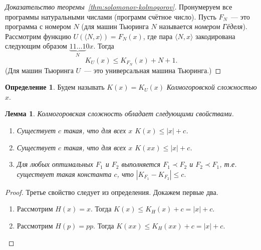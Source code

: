 \documentclass[12pt]{article}
\theoremstyle{definition}
\newtheorem{definition}{Определение}[section]
\theoremstyle{plain}
\newtheorem{lemma}{Лемма}[section]
\theoremstyle{remark}
\begin{document}
\begin{proof}[Доказательство теоремы~\ref{thm:solomonov-kolmogorov}]
    Пронумеруем все программы натуральными числами (программ счётное число). Пусть $F_N$~— 
    это программа с номером $N$ (для машин Тьюринга $N$ называется \emph{номером Гёделя}). 
    Рассмотрим функцию $U(\langle N, x\rangle) = F_N(x)$, где пара $\langle
    N,x\rangle$ закодирована следующим образом $\underbrace{11\dots1}_{N}0x$.
    Тогда 
    \[
        K_U(x)\le K_{F_N}(x) + N + 1.
    \]
    (Для машин Тьюринга $U$~--- это универсальная машина Тьюринга.)
\end{proof}
\begin{definition}
    Будем называть $K(x) = K_U(x)$ \emph{Колмогоровской сложностью $x$}.
\end{definition}

\begin{lemma} Колмогоровская сложность обладает следующими свойствами.
\begin{enumerate}
    \item Существует $c$ такая, что для всех $x$ $K(x)\le |x| + c$. 
    \item Существует $c$ такая, что для всех $x$ $K(xx)\le |x| + c$.
    \item Для любых оптимальных $F_1$ и $F_2$ выполняется $F_1\prec F_2$ и $F_2\prec F_1$,
        т.е. существует такая константа $c$, что 
        \(
            |K_{F_1} - K_{F_2}| \le c.            
        \)
\end{enumerate}
\end{lemma}
\begin{proof} Третье свойство следует из определения. Докажем первые два.
\begin{enumerate}
    \item Рассмотрим $H(x) = x$. Тогда
        \(K(x)\le K_H(x) + c = |x| + c\).
    \item Рассмотрим $H(p) = pp$. Тогда
        \(K(xx)\le K_H(xx) + c = |x| + c\).
\end{enumerate}
\end{proof}
\end{document}
